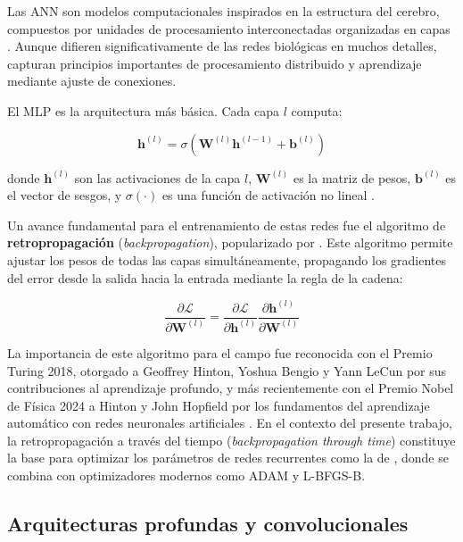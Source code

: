 Las \acrfull{ANN} son modelos computacionales inspirados en la estructura del cerebro, compuestos por unidades de procesamiento interconectadas organizadas en capas \citep{heaton2018ian}. Aunque difieren significativamente de las redes biológicas en muchos detalles, capturan principios importantes de procesamiento distribuido y aprendizaje mediante ajuste de conexiones.

El \acrfull{MLP} es la arquitectura más básica. Cada capa $l$ computa:

\begin{equation}
\mathbf{h}^{(l)} = \sigma(\mathbf{W}^{(l)}\mathbf{h}^{(l-1)} + \mathbf{b}^{(l)})
\label{eq:mlp_layer}
\end{equation}

donde $\mathbf{h}^{(l)}$ son las activaciones de la capa $l$, $\mathbf{W}^{(l)}$ es la matriz de pesos, $\mathbf{b}^{(l)}$ es el vector de sesgos, y $\sigma(\cdot)$ es una función de activación no lineal \citep{heaton2018ian}.

Un avance fundamental para el entrenamiento de estas redes fue el algoritmo de \textbf{retropropagación} (\textit{backpropagation}), popularizado por \citet{rumelhart1986learning}. Este algoritmo permite ajustar los pesos de todas las capas simultáneamente, propagando los gradientes del error desde la salida hacia la entrada mediante la regla de la cadena:

\begin{equation}
\frac{\partial \mathcal{L}}{\partial \mathbf{W}^{(l)}} = \frac{\partial \mathcal{L}}{\partial \mathbf{h}^{(l)}} \frac{\partial \mathbf{h}^{(l)}}{\partial \mathbf{W}^{(l)}}
\label{eq:backprop}
\end{equation}

La importancia de este algoritmo para el campo fue reconocida con el Premio Turing 2018, otorgado a Geoffrey Hinton, Yoshua Bengio y Yann LeCun por sus contribuciones al aprendizaje profundo, y más recientemente con el Premio Nobel de Física 2024 a Hinton y John Hopfield por los fundamentos del aprendizaje automático con redes neuronales artificiales \citep{hinton2024nobel}. En el contexto del presente trabajo, la retropropagación a través del tiempo (\textit{backpropagation through time}) constituye la base para optimizar los parámetros de redes recurrentes como la de \citet{echeveste2020cortical}, donde se combina con optimizadores modernos como ADAM y L-BFGS-B.

\subsection{Arquitecturas profundas y convolucionales}
\label{subsec:arquitecturas_profundas}

